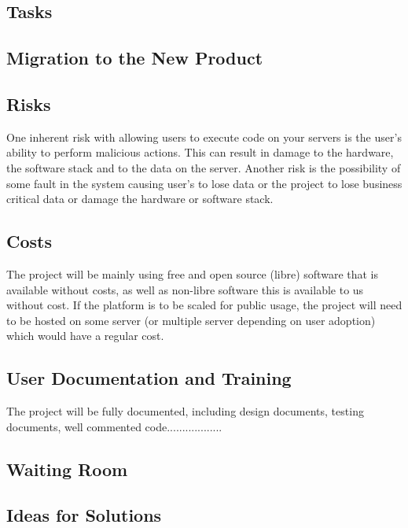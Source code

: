 \documentclass[12pt, titlepage]{article}
\begin{document}
  \subsection{Tasks}

  \subsection{Migration to the New Product}

  \subsection{Risks}
  One inherent risk with allowing users to execute code on your servers is the
  user's ability to perform malicious actions. This can result in damage to the
  hardware, the software stack and to the data on the server.  Another risk is
  the possibility of some fault in the system causing user's to lose data or
  the project to lose business critical data or damage the hardware or software
  stack.

  \subsection{Costs}
  The project will be mainly using free and open source (libre) software that
  is available without costs, as well as non-libre software this is available
  to us without cost. If the platform is to be scaled for public usage, the
  project will need to be hosted on some server (or multiple server depending
  on user adoption) which would have a regular cost.

  \subsection{User Documentation and Training}
  The project will be fully documented, including design documents, testing documents, well commented code..................

  \subsection{Waiting Room}

  \subsection{Ideas for Solutions}




\end{document}
